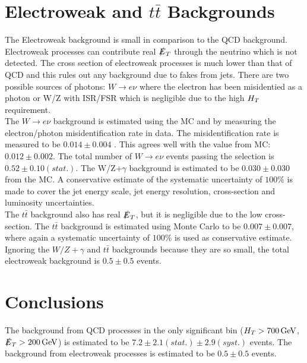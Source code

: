\section{Electroweak and $t\bar{t}$ Backgrounds}

The Electroweak background is small in comparison to the QCD background.
Electroweak processes can contribute real $\slashed{E}_{T}$ through the neutrino which is 
not detected. The cross section of electroweak processes is much lower than
that of QCD and this rules out any background due to fakes from jets. There are
two possible sources of photons: $W\rightarrow e\nu$ where the electron has been
misidentied as a photon or W/Z with ISR/FSR which is negligible due to the high 
$H_{T}$ requirement. \\

The $W\rightarrow e\nu$ background is estimated using the MC and by measuring 
the electron/photon misidentification rate in data. The misidentification rate 
is measured to be $0.014\pm0.004$ \cite{ra3}. This agrees well with the value 
from MC: $0.012\pm0.002$. The total number of $W\rightarrow e\nu$ events passing 
the selection is $0.52\pm0.10(stat.)$. The W/Z+$\gamma$ background is estimated 
to be $0.030\pm0.030$ from the MC. A conservative estimate of the systematic 
uncertainty of $100\unit{\%}$ is made to cover the jet energy scale, jet energy 
resolution, cross-section and luminosity uncertainties. \\

The $t\bar{t}$ background also has real $\slashed{E}_{T}$, but it is negligible due to the
low cross-section. The $t\bar{t}$ background is estimated using Monte Carlo to
be $0.007\pm0.007$, where again a systematic uncertainty of $100\unit{\%}$ is
used as conservative estimate. \\

Ignoring the $W/Z+\gamma$ and $t\bar{t}$ backgrounds because they are so small, 
the total electroweak background is $0.5\pm0.5$ events.
 
\section{Conclusions}

The background from QCD processes in the only significant bin
($H_{T}>700\, \mathrm{GeV}$, $\slashed{E}_{T}>200\, \mathrm{GeV}$) is estimated to be 
$7.2\pm2.1(stat.)\pm2.9(syst.)$ events. The background from electroweak
processes is estimated to be $0.5\pm0.5$ events.
